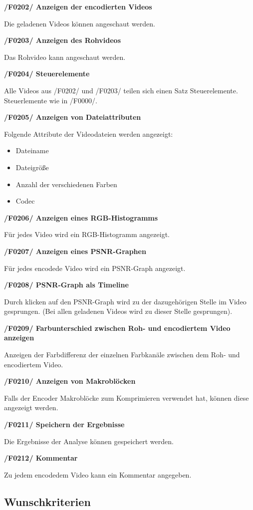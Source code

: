 \documentclass[parskip=full]{scrartcl}
\begin{document}
\textbf{/F0202/ Anzeigen der encodierten Videos}

Die geladenen Videos können angeschaut werden.

\textbf{/F0203/ Anzeigen des Rohvideos}

Das Rohvideo kann angeschaut werden.

\textbf{/F0204/ Steuerelemente}

Alle Videos aus /F0202/ und /F0203/ teilen sich einen Satz Steuerelemente. Steuerlemente wie in /F0000/.

\textbf{/F0205/ Anzeigen von Dateiattributen}

Folgende Attribute der Videodateien werden angezeigt:
\begin{itemize}
\item Dateiname
\item Dateigröße
\item Anzahl der verschiedenen Farben
\item Codec
\end{itemize}

\textbf{/F0206/ Anzeigen eines RGB-Histogramms}

Für jedes Video wird ein RGB-Histogramm angezeigt.

\textbf{/F0207/ Anzeigen eines PSNR-Graphen}

Für jedes encodede Video wird ein PSNR-Graph angezeigt.

\textbf{/F0208/ PSNR-Graph als Timeline}

Durch klicken auf den PSNR-Graph wird zu der dazugehörigen Stelle im Video gesprungen. (Bei allen geladenen Videos wird zu dieser Stelle gesprungen).

\textbf{/F0209/ Farbunterschied zwischen Roh- und encodiertem Video anzeigen}

Anzeigen der Farbdifferenz der einzelnen Farbkanäle zwischen dem Roh- und encodiertem Video.

\textbf{/F0210/ Anzeigen von Makroblöcken}

Falls der Encoder Makroblöcke zum Komprimieren verwendet hat, können diese angezeigt werden.

\textbf{/F0211/ Speichern der Ergebnisse}

Die Ergebnisse der Analyse können gespeichert werden.

\textbf{/F0212/ Kommentar}

Zu jedem encodedem Video kann ein Kommentar angegeben.
\subsection{Wunschkriterien}
\end{document}
